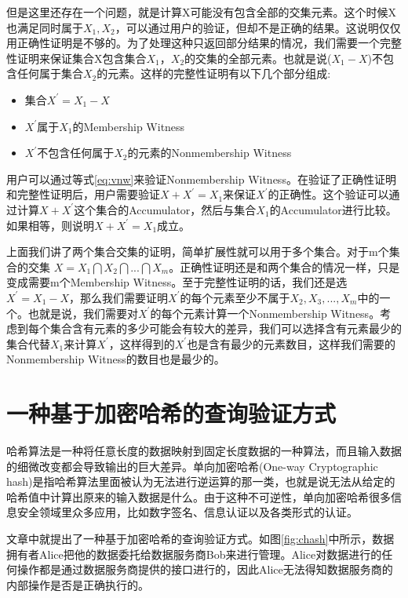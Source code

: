 但是这里还存在一个问题，就是计算X可能没有包含全部的交集元素。这个时候X也满足同时属于$X_1, X_2$，可以通过用户的验证，但却不是正确的结果。这说明仅仅用正确性证明是不够的。为了处理这种只返回部分结果的情况，我们需要一个完整性证明来保证集合X包含集合$X_1$，$X_2$的交集的全部元素。也就是说($X_1 - X$)不包含任何属于集合$X_2$的元素。这样的完整性证明有以下几个部分组成:
\begin{itemize}
\item 集合$X^\prime = X_1 - X$
\item $X^\prime$属于$X_1$的Membership Witness
\item $X^\prime$不包含任何属于$X_2$的元素的Nonmembership Witness
\end{itemize}

用户可以通过等式\ref{eq:vnw}来验证Nonmembership Witness。在验证了正确性证明和完整性证明后，用户需要验证$X + X^\prime = X_1$来保证$X^\prime$的正确性。这个验证可以通过计算$X + X^\prime$这个集合的Accumulator，然后与集合$X_1$的Accumulator进行比较。如果相等，则说明$X + X^\prime = X_1$成立。

上面我们讲了两个集合交集的证明，简单扩展性就可以用于多个集合。对于m个集合的交集 $X = X_1 \bigcap X_2 \bigcap ... \bigcap X_m$。正确性证明还是和两个集合的情况一样，只是变成需要m个Membership Witness。至于完整性证明的话，我们还是选$X^\prime = X_1 - X$，那么我们需要证明$X^\prime$的每个元素至少不属于$X_2, X_3,...,X_m$中的一个。也就是说，我们需要对$X^\prime$的每个元素计算一个Nonmembership Witness。考虑到每个集合含有元素的多少可能会有较大的差异，我们可以选择含有元素最少的集合代替$X_1$来计算$X^\prime$，这样得到的$X^\prime$也是含有最少的元素数目，这样我们需要的Nonmembership Witness的数目也是最少的。

\section{一种基于加密哈希的查询验证方式}
哈希算法是一种将任意长度的数据映射到固定长度数据的一种算法，而且输入数据的细微改变都会导致输出的巨大差异。单向加密哈希(One-way Cryptographic hash)是指哈希算法里面被认为无法进行逆运算的那一类，也就是说无法从给定的哈希值中计算出原来的输入数据是什么。由于这种不可逆性，单向加密哈希很多信息安全领域里众多应用，比如数字签名、信息认证以及各类形式的认证。

文章\cite{sion2005query}中就提出了一种基于加密哈希的查询验证方式。如图\ref{fig:chash}中所示，数据拥有者Alice把他的数据委托给数据服务商Bob来进行管理。Alice对数据进行的任何操作都是通过数据服务商提供的接口进行的，因此Alice无法得知数据服务商的内部操作是否是正确执行的。

